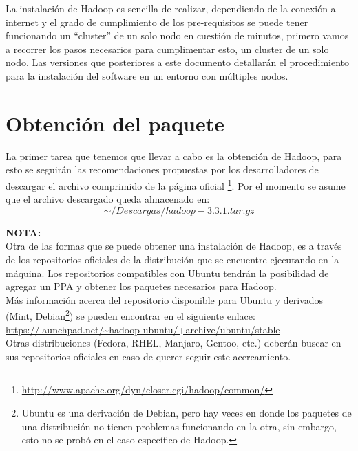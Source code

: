 La instalación de Hadoop es sencilla de realizar, dependiendo de la conexión a
internet y el grado de cumplimiento de los pre-requisitos se puede tener
funcionando un ``\gls{cluster}'' de un solo nodo en cuestión de minutos,
primero vamos a recorrer los pasos necesarios para cumplimentar esto, un
\gls{cluster} de un solo nodo. Las versiones que posteriores a este documento
detallarán el procedimiento para la instalación del software en un entorno con
múltiples nodos.

\section{Obtención del paquete}
\label{sec:obtencion_del_paquete}

La primer tarea que tenemos que llevar a cabo es la obtención de Hadoop, para
esto se seguirán las recomendaciones propuestas por los desarrolladores de
descargar el archivo comprimido de la página oficial
\footnote{\url{http://www.apache.org/dyn/closer.cgi/hadoop/common/}}. Por el
momento se asume que el archivo descargado queda almacenado en: \\
$$\sim/Descargas/hadoop-3.3.1.tar.gz$$

\begin{tcolorbox}
  {\bf NOTA:} \\ \newline Otra de las formas que se puede obtener una
  instalación de Hadoop, es a través de los repositorios oficiales de la
  distribución que se encuentre ejecutando en la máquina. Los repositorios
  compatibles con Ubuntu tendrán la posibilidad de agregar un PPA y obtener los
  paquetes necesarios para Hadoop. \\ Más información acerca del repositorio
  disponible para Ubuntu y derivados (Mint, Debian\footnote{Ubuntu es una
  derivación de Debian, pero hay veces en donde los paquetes de una
  distribución no tienen problemas funcionando en la otra, sin embargo, esto no
  se probó en el caso específico de Hadoop.}) se pueden encontrar en el siguiente
  enlace:
  \\ \newline 
  \url{https://launchpad.net/~hadoop-ubuntu/+archive/ubuntu/stable} 
  \\ \newline Otras
  distribuciones (Fedora, RHEL, Manjaro, Gentoo, etc.) deberán buscar en
  sus repositorios oficiales en caso de querer seguir este acercamiento.
\end{tcolorbox}

